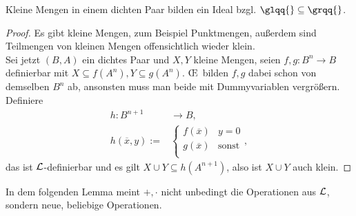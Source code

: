 \begin{lemma}
	Kleine Mengen in einem dichten Paar bilden ein Ideal bzgl. $\glqq{}\subseteq\grqq{}$.
\end{lemma}
\begin{proof}
	Es gibt kleine Mengen, zum Beispiel Punktmengen, außerdem sind Teilmengen von kleinen Mengen offensichtlich wieder klein.\\
	Sei jetzt $(B,A)$ ein dichtes Paar und $X,Y$ kleine Mengen, seien $f,g:B^n\rightarrow B$ definierbar mit $X\subseteq f(A^n),Y\subseteq g(A^n)$. \OE\ bilden $f,g$ dabei schon von demselben $B^n$ ab, ansonsten muss man beide mit Dummyvariablen vergrößern. Definiere
	\begin{align*}
	h:B^{n+1}&\rightarrow B,\\
	h(\overline{x},y):=&\left\{\begin{array}{ll}
	f(\overline{x})&y=0\\
	g(\overline{x})&\text{sonst}\\
	\end{array}\right.,
	\end{align*}
	das ist $\mathcal{L}$-definierbar und es gilt $X\cup Y\subseteq h(A^{n+1})$, also ist $X\cup Y$ auch klein.
\end{proof}

In dem folgenden Lemma meint $+,\cdot$ nicht unbedingt die Operationen aus $\mathcal{L}$, sondern neue, beliebige Operationen.

